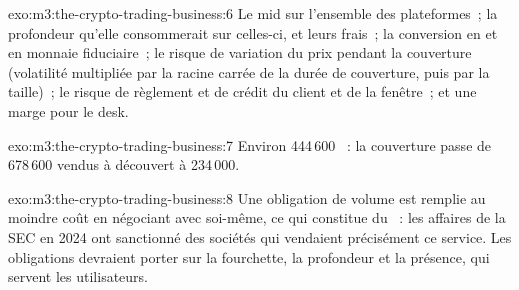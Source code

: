 \begin{solution}{exo:m3:the-crypto-trading-business:6}
Le mid sur l'ensemble des plateformes~; la profondeur qu'elle consommerait sur celles-ci, et leurs frais~; la conversion en  et en monnaie fiduciaire~; le risque de variation du prix
pendant la couverture (volatilité multipliée par la racine carrée de la durée de couverture, puis par la taille)~; le risque de règlement et de crédit du client
et de la fenêtre~; et une marge pour le desk.
\end{solution}

\begin{solution}{exo:m3:the-crypto-trading-business:7}
Environ 444\,600 ~: la couverture passe de 678\,600  vendus à découvert à 234\,000.
\end{solution}

\begin{solution}{exo:m3:the-crypto-trading-business:8}
Une obligation de volume est remplie au moindre coût en négociant avec soi-même, ce qui constitue du ~: les affaires de la SEC en 2024 ont sanctionné des sociétés qui vendaient précisément
ce service. Les obligations devraient porter sur la fourchette, la profondeur et la présence, qui servent les utilisateurs.
\end{solution}

